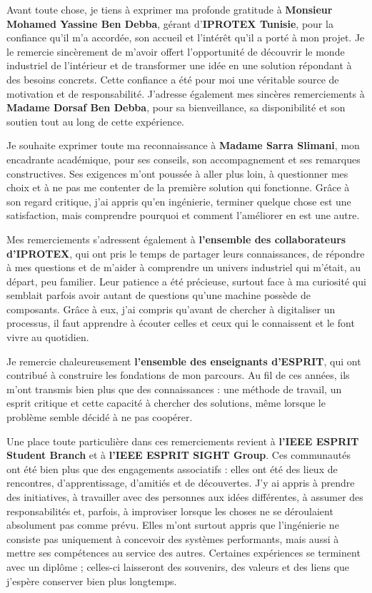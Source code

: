 Avant toute chose, je tiens à exprimer ma profonde gratitude à \textbf{Monsieur Mohamed Yassine Ben Debba}, gérant d’\textbf{IPROTEX Tunisie}, pour la confiance qu’il m’a accordée, son accueil et l’intérêt qu’il a porté à mon projet. Je le remercie sincèrement de m’avoir offert l’opportunité de découvrir le monde industriel de l’intérieur et de transformer une idée en une solution répondant à des besoins concrets. Cette confiance a été pour moi une véritable source de motivation et de responsabilité. J’adresse également mes sincères remerciements à \textbf{Madame Dorsaf Ben Debba}, pour sa bienveillance, sa disponibilité et son soutien tout au long de cette expérience.

Je souhaite exprimer toute ma reconnaissance à \textbf{Madame Sarra Slimani}, mon encadrante académique, pour ses conseils, son accompagnement et ses remarques constructives. Ses exigences m’ont poussée à aller plus loin, à questionner mes choix et à ne pas me contenter de la première solution qui fonctionne. Grâce à son regard critique, j’ai appris qu’en ingénierie, terminer quelque chose est une satisfaction, mais comprendre pourquoi et comment l’améliorer en est une autre.

Mes remerciements s’adressent également à \textbf{l’ensemble des collaborateurs d’IPROTEX}, qui ont pris le temps de partager leurs connaissances, de répondre à mes questions et de m’aider à comprendre un univers industriel qui m’était, au départ, peu familier. Leur patience a été précieuse, surtout face à ma curiosité qui semblait parfois avoir autant de questions qu’une machine possède de composants. Grâce à eux, j’ai compris qu’avant de chercher à digitaliser un processus, il faut apprendre à écouter celles et ceux qui le connaissent et le font vivre au quotidien.

Je remercie chaleureusement \textbf{l’ensemble des enseignants d’ESPRIT}, qui ont contribué à construire les fondations de mon parcours. Au fil de ces années, ils m’ont transmis bien plus que des connaissances : une méthode de travail, un esprit critique et cette capacité à chercher des solutions, même lorsque le problème semble décidé à ne pas coopérer.

Une place toute particulière dans ces remerciements revient à \textbf{l’IEEE ESPRIT Student Branch} et à \textbf{l’IEEE ESPRIT SIGHT Group}. Ces communautés ont été bien plus que des engagements associatifs : elles ont été des lieux de rencontres, d’apprentissage, d’amitiés et de découvertes. J’y ai appris à prendre des initiatives, à travailler avec des personnes aux idées différentes, à assumer des responsabilités et, parfois, à improviser lorsque les choses ne se déroulaient absolument pas comme prévu. Elles m’ont surtout appris que l’ingénierie ne consiste pas uniquement à concevoir des systèmes performants, mais aussi à mettre ses compétences au service des autres. Certaines expériences se terminent avec un diplôme ; celles-ci laisseront des souvenirs, des valeurs et des liens que j’espère conserver bien plus longtemps.

